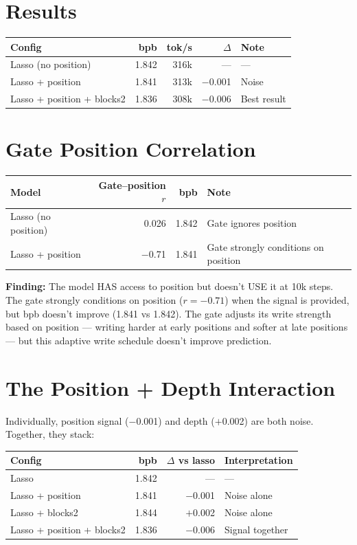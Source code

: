 \documentclass[11pt,a4paper]{report}
\newcommand{\finding}[1]{\textcolor{finding}{\textbf{Finding:}} #1}
\begin{document}
\section{Results}

\begin{center}
\begin{tabular}{lrrrl}
\toprule
Config & bpb & tok/s & $\Delta$ & Note \\
\midrule
Lasso (no position) & 1.842 & 316k & --- & --- \\
Lasso + position & 1.841 & 313k & $-$0.001 & Noise \\
Lasso + position + blocks2 & 1.836 & 308k & $-$0.006 & Best result \\
\bottomrule
\end{tabular}
\end{center}

\section{Gate Position Correlation}

\begin{center}
\begin{tabular}{lrrl}
\toprule
Model & Gate--position $r$ & bpb & Note \\
\midrule
Lasso (no position) & 0.026 & 1.842 & Gate ignores position \\
Lasso + position & $-$0.71 & 1.841 & Gate strongly conditions on position \\
\bottomrule
\end{tabular}
\end{center}

\finding{The model HAS access to position but doesn't USE it at 10k steps.} The gate strongly conditions on position ($r = -0.71$) when the signal is provided, but bpb doesn't improve (1.841 vs 1.842). The gate adjusts its write strength based on position --- writing harder at early positions and softer at late positions --- but this adaptive write schedule doesn't improve prediction.

\section{The Position + Depth Interaction}

Individually, position signal ($-$0.001) and depth ($+$0.002) are both noise. Together, they stack:

\begin{center}
\begin{tabular}{lrrl}
\toprule
Config & bpb & $\Delta$ vs lasso & Interpretation \\
\midrule
Lasso & 1.842 & --- & --- \\
Lasso + position & 1.841 & $-$0.001 & Noise alone \\
Lasso + blocks2 & 1.844 & $+$0.002 & Noise alone \\
Lasso + position + blocks2 & 1.836 & $-$0.006 & Signal together \\
\bottomrule
\end{tabular}
\end{center}
\end{document}

